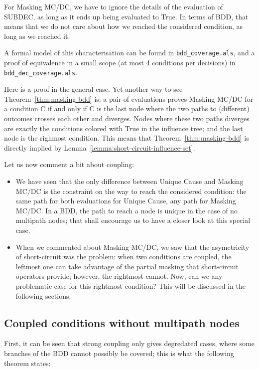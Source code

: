 \documentclass[a4paper,12pt,twoside]{article}
\newcommand{\alloyspec}[1]{\texttt{#1}}
\begin{document}
For Masking MC/DC, we have to ignore the details of the evaluation of SUBDEC,
as long as it ends up being evaluated to True. In terms of BDD, that means
that we do not care about how we reached the considered condition, as long
as we reached it.

A formal model of this characterisation can be found in
\alloyspec{bdd\_coverage.als}, and a proof of equivalence in a small scope
(at most 4 conditions per decisions) in \alloyspec{bdd\_dec\_coverage.als}.

Here is a proof in the general case. Yet another way to see
Theorem~\ref{thm:masking-bdd} is: a pair of evaluations proves Masking
MC/DC for a condition C if and only if C is the last node where the
two paths to (different) outcomes crosses each other and
diverges. Nodes where these two paths diverges are exactly the
conditions colored with True in the influence tree; and the last node
is the righmost condition.  This means that
Theorem~\ref{thm:masking-bdd} is directly implied by
Lemma~\ref{lemma:short-circuit-influence-set}.

Let us now comment a bit about coupling:
\begin{itemize}

\item We have seen that the only difference between Unique Cause and
Masking MC/DC is the constraint on the way to reach the considered
condition: the same path for both evaluations for Unique Cause, any
path for Masking MC/DC. In a BDD, the path to reach a node is unique
in the case of no multipath nodes; that shall encourage us to have a closer
look at this special case.

\item When we commented about Masking MC/DC, we saw that the
asymetricity of short-circuit was the problem: when two conditions are
coupled, the leftmost one can take advantage of the partial masking that
short-circuit operators provide; however, the rightmost cannot. Now,
can we any problematic case for this rightmost condition? This will be
discussed in the following sections.
\end{itemize}


\subsection{Coupled conditions without multipath nodes}

First, it can be seen that strong coupling only gives degredated cases,
where some branches of the BDD cannot possibly be covered; this is
what the following theorem states:
\end{document}
